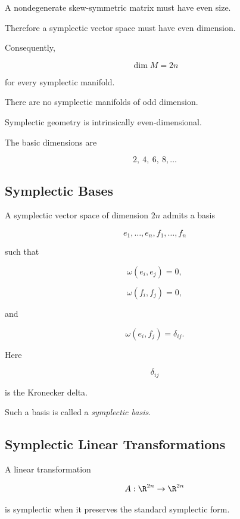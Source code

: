 A nondegenerate skew-symmetric matrix must have even size.

Therefore a symplectic vector space must have even dimension.

Consequently,

\[
\boxed{
\dim M=2n
}
\]

for every symplectic manifold.

There are no symplectic manifolds of odd dimension.

\begin{importantbox}
Symplectic geometry is intrinsically even-dimensional.

The basic dimensions are

\[
2,\ 4,\ 6,\ 8,\ldots
\]
\end{importantbox}

\subsection{Symplectic Bases}
\label{subsec:symplectic-bases}

A symplectic vector space of dimension \(2n\) admits a basis

\[
e_1,\ldots,e_n,f_1,\ldots,f_n
\]

such that

\[
\boxed{
\omega(e_i,e_j)=0,
}
\]

\[
\boxed{
\omega(f_i,f_j)=0,
}
\]

and

\[
\boxed{
\omega(e_i,f_j)=\delta_{ij}.
}
\]

Here

\[
\delta_{ij}
\]

is the Kronecker delta.

Such a basis is called a \emph{symplectic basis}.

\subsection{Symplectic Linear Transformations}
\label{subsec:symplectic-linear-transformations}

A linear transformation

\[
A:\R^{2n}\to\R^{2n}
\]

is symplectic when it preserves the standard symplectic form.

